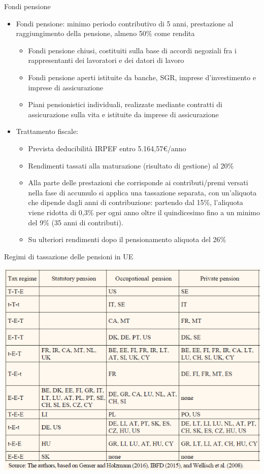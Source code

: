 \documentclass[11pt,italian]{beamer}
\begin{document}
\begin{frame}{Fondi pensione}
\begin{itemize}
\item Fondi pensione: minimo periodo contributivo di 5 anni, prestazione al
raggiungimento della pensione, almeno 50\% come rendita
\begin{itemize}
\item \alert{Fondi pensione chiusi}, costituiti sulla base di accordi negoziali fra i rappresentanti dei lavoratori e dei datori di lavoro
\item \alert{Fondi pensione aperti} istituite da banche, SGR, imprese d’investimento e imprese di assicurazione
\item \alert{Piani pensionistici individuali}, realizzate mediante contratti di assicurazione sulla vita e istituite da imprese di assicurazione
\end{itemize}
\item Trattamento fiscale:
\begin{itemize}
\item Prevista deducibilità IRPEF entro 5.164,57€/anno
\item Rendimenti tassati alla maturazione (risultato di gestione) al 20\%
\item Alla parte delle prestazioni che corrisponde ai contributi/premi versati
nella fase di accumulo si applica una tassazione separata, con un’aliquota
che dipende dagli anni di contribuzione: partendo dal 15\%, l’aliquota
viene ridotta di 0,3\% per ogni anno oltre il quindicesimo fino a un minimo
del 9\% (35 anni di contributi).
\item Su ulteriori rendimenti dopo il pensionamento aliquota del 26\%
\end{itemize}
\end{itemize}
\end{frame}

\begin{frame}{Regimi di tassazione delle pensioni in UE}
\begin{center}
\includegraphics[width=.9\linewidth]{./figure/regimi-tassazione-pensioni.png}
\end{center}
\end{frame}
\end{document}
